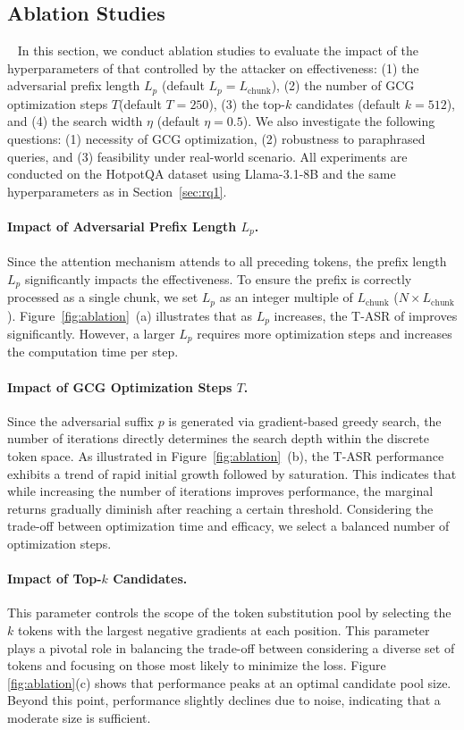 
\subsection{Ablation Studies}~\label{sec: ablation}
In this section, we conduct ablation studies to evaluate the impact of the hyperparameters of \sys that controlled by the attacker on effectiveness: (1) the adversarial prefix length $L_p$ (default $L_p = L_\mathrm{chunk}$), (2) the number of GCG optimization steps $T $(default $T = 250$), (3) the top-$k$ candidates (default $k = 512$), and (4) the search width $\eta$ (default $\eta = 0.5$).
% 
We also investigate the following questions: (1) necessity of GCG optimization, (2) robustness to paraphrased queries, and (3) feasibility under real-world scenario.
% 
All experiments are conducted on the HotpotQA dataset using Llama-3.1-8B and the same hyperparameters as in Section~\ref{sec:rq1}. 

\paragraph{Impact of Adversarial Prefix Length $L_p$.}
Since the attention mechanism attends to all preceding tokens, the prefix length $L_p$ significantly impacts the effectiveness. To ensure the prefix is correctly processed as a single chunk, we set $L_p$ as an integer multiple of $L_{\text{chunk}}$ ($N\times L_{\text{chunk}}$). 
% 
Figure~\ref{fig:ablation}~(a) illustrates that as $L_p$ increases, the T-ASR of \sys improves significantly. However, a larger $L_p$ requires more optimization steps and increases the computation time per step. 


\paragraph{Impact of GCG Optimization Steps $T$.} 
Since the adversarial suffix $p$ is generated via gradient-based greedy search, the number of iterations directly determines the search depth within the discrete token space. As illustrated in Figure~\ref{fig:ablation}~(b), the T-ASR performance exhibits a trend of rapid initial growth followed by saturation. This indicates that while increasing the number of iterations improves performance, the marginal returns gradually diminish after reaching a certain threshold. Considering the trade-off between optimization time and efficacy, we select a balanced number of optimization steps.

\paragraph{Impact of Top-$k$ Candidates.}
This parameter controls the scope of the token substitution pool by selecting the $k$ tokens with the largest negative gradients at each position. This parameter plays a pivotal role in balancing the trade-off between considering a diverse set of tokens and focusing on those most likely to minimize the loss. 
% 
Figure \ref{fig:ablation}(c) shows that performance peaks at an optimal candidate pool size. Beyond this point, performance slightly declines due to noise, indicating that a moderate size is sufficient.


